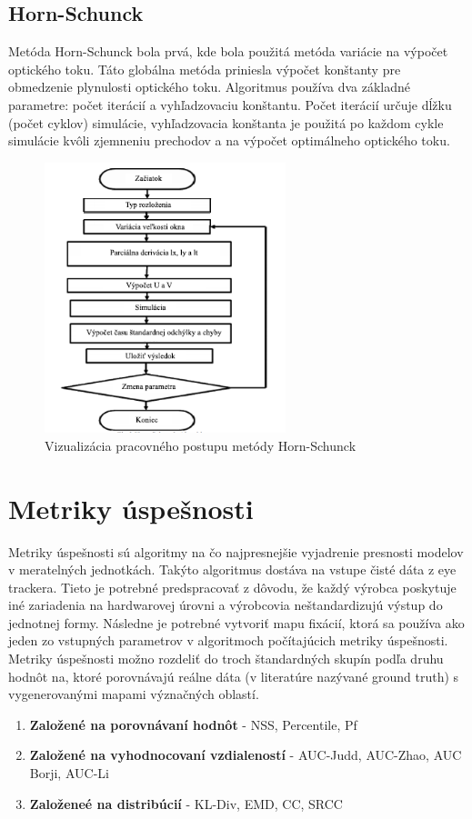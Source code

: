 \subsection{Horn-Schunck}
Metóda Horn-Schunck bola prvá, kde bola použitá metóda variácie na výpočet optického toku.
Táto globálna metóda priniesla výpočet  konštanty pre obmedzenie plynulosti optického toku.
Algoritmus používa dva základné parametre: počet iterácií a vyhľadzovaciu konštantu.
Počet iterácií určuje dĺžku (počet cyklov) simulácie, vyhľadzovacia konštanta je použitá po každom cykle simulácie kvôli zjemneniu prechodov a na výpočet optimálneho optického toku.

\begin{figure}[H]
  \centering
  \includegraphics[width=7cm]{pics/horn-schunck.png}
  \caption{Vizualizácia pracovného postupu metódy Horn-Schunck}
\end{figure}
\vspace{10mm}

\section{Metriky úspešnosti}
Metriky úspešnosti sú algoritmy na čo najpresnejšie vyjadrenie presnosti modelov v meratelných jednotkách.
Takýto algoritmus dostáva na vstupe čisté dáta z eye trackera.
Tieto je potrebné predspracovať z dôvodu, že každý výrobca poskytuje iné zariadenia na hardwarovej úrovni a výrobcovia neštandardizujú výstup do jednotnej formy.
Následne je potrebné vytvoriť mapu fixácií, ktorá sa používa ako jeden zo vstupných parametrov v algoritmoch počítajúcich metriky úspešnosti.
\\
Metriky úspešnosti možno rozdeliť do troch štandardných skupín podľa druhu hodnôt na, ktoré porovnávajú reálne dáta (v literatúre nazývané ground truth) s vygenerovanými mapami význačných oblastí\cite{metrics-1}.
\begin{enumerate}
  \item\textbf{Založené na porovnávaní hodnôt} - NSS, Percentile, Pf
  \item\textbf{Založené na vyhodnocovaní vzdialeností} - AUC-Judd, AUC-Zhao, AUC Borji, AUC-Li
  \item\textbf{Založeneé na distribúcií} - KL-Div, EMD, CC, SRCC
\end{enumerate}

